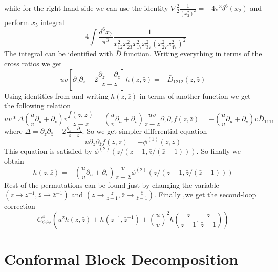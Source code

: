 \documentclass[12pt,a4paper,oneside]{book}
\theoremstyle{definition}
\begin{document}
        while for the right hand side we can use the identity $\nabla_2^2 \frac{1}{(x_2^2)^2} = -4\pi^3\delta^6(x_2)$ and perform $x_5$ integral
        \begin{equation}
            -4 \int \frac{d^6x_7}{\pi^3} \frac{1}{x_{12}^2x_{23}^2x_{17}^2x_{37}^2(x_{27}^2x_{47}^2)^2}
        \end{equation} 
        The integral can be identified with $\bar{D}$ function. Writing everything in terms of the cross ratios we get
        \begin{equation}
            uv\left[\partial_z\partial_{\bar{z}} - 2\frac{\partial_z - \partial_{\bar{z}}}{z-\bar{z}}\right]h(z,\bar{z}) = -\bar{D}_{1212}(z,\bar{z})
        \end{equation}
        Using identities from \cite{dfunction} and writing $h(z,\bar{z})$ in terms of another function we get the following relation
        \begin{equation}
            uv*\Delta\left(\frac{u}{v}\partial_u + \partial_v\right)v\frac{f(z,\bar{z})}{z-\bar{z}} = \left(\frac{u}{v}\partial_u + \partial_v\right)\frac{uv}{z-\bar{z}}\partial_z\partial_{\bar{z}}f(z,\bar{z}) = -\left(\frac{u}{v}\partial_u + \partial_v\right) v \bar{D}_{1111}
        \end{equation}
        where $\Delta = \partial_z\partial_{\bar{z}} - 2\frac{\partial_z - \partial_{\bar{z}}}{z-\bar{z}}$. So we get simpler differential equation
        \begin{equation}
            u\partial_z\partial_{\bar{z}}f(z,\bar{z}) = -\phi^{(1)}(z,\bar{z})
        \end{equation}
        This equation is satisfied by $\phi^{(2)}(z/(z-1,\bar{z}/(\bar{z}-1)))$. So finally we obtain 
        \begin{equation}
            h(z,\bar{z}) = - \left(\frac{u}{v}\partial_u + \partial_v\right)\frac{v}{z-\bar{z}}\phi^{(2)}(z/(z-1,\bar{z}/(\bar{z}-1)))
        \end{equation}
        Rest of the permutations can be found just by changing the variable $(z \to z^{-1},\bar{z}\to\bar{z}^{-1} )$ and $(z\to\frac{z}{z-1},\bar{z}\to\frac{\bar{z}}{\bar{z}-1})$. Finally ,we get the second-loop correction
        \begin{equation}
            C_{\phi\phi\phi}^4\left(u^2h(z,\bar{z}) + h(z^{-1},\bar{z}^{-1}) + \left(\frac{u}{v}\right)^2h\left(\frac{z}{z-1},\frac{\bar{z}}{\bar{z}-1} \right) \right)
        \end{equation}

\chapter{Conformal Block Decomposition}\label{conformal-block-decomposition}
\end{document}

